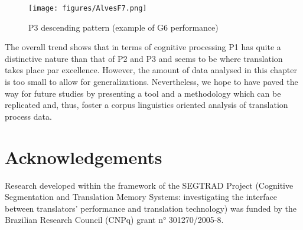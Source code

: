 \documentclass[output=paper]{LSP/langsci}
\begin{document}
\begin{figure}[t]
\texttt{[image: figures/AlvesF7.png]}
\caption{P3 descending pattern (example of G6 performance)}
\label{fig:alves:7}
\end{figure} 

The overall trend shows that in terms of cognitive processing P1 has quite a distinctive nature than that of P2 and P3 and seems to be where translation takes place par excellence. However, the amount of data analysed in this chapter is too small to allow for generalizations. Nevertheless, we hope to have paved the way for future studies by presenting a tool and a methodology which can be replicated and, thus, foster a corpus linguistics oriented analysis of translation process data. 

\section*{Acknowledgements}
\largerpage[-1]
Research developed within the framework of the SEGTRAD Project (Cognitive Segmentation and Translation Memory Systems: investigating the interface between translators' performance and translation technology)  was funded by the Brazilian Research Council (CNPq) grant n° 301270/2005-8.

{\sloppy 
\printbibliography[heading=subbibliography,notkeyword=this]
}
\end{document}

